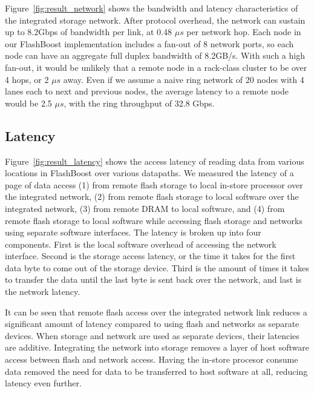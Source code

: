 Figure~\ref{fig:result_network} shows the bandwidth and latency characteristics
of the integrated storage network. After protocol overhead, the network can
sustain up to 8.2Gbps of bandwidth per link, at 0.48 $\mu s$ per network hop.
Each node in our FlashBoost implementation includes a fan-out of 8 network
ports, so each node can have an aggregate full duplex bandwidth of 8.2GB/s. With
such a high fan-out, it would be unlikely that a remote node in a rack-class
cluster to be over 4 hops, or 2 $\mu s$ away. Even if we assume a naive ring
network of 20 nodes with 4 lanes each to next and previous nodes, the average
latency to a remote node would be 2.5 $\mu s$, with the ring throughput of 32.8
Gbps.


\subsection{Latency}

Figure~\ref{fig:result_latency} shows the access latency of reading data from
various locations in FlashBoost over various datapaths. We measured the latency of
a page of data access (1) from remote flash storage to local in-store processor
over the integrated network, (2) from remote flash storage to local software
over the integrated network, (3) from remote DRAM to local software, and (4)
from remote flash storage to local software while accessing flash storage and
networks using separate software interfaces. The latency is broken up into four
components. First is the local software overhead of accessing the network
interface. Second is the storage access latency, or the time it takes for the
first data byte to come out of the storage device. Third is the amount of times
it takes to transfer the data until the last byte is sent back over the network,
and last is the network latency.

It can be seen that remote flash access over the integrated network link reduces
a significant amount of latency compared to using flash and networks as separate
devices. When storage and network are used as separate devices, their latencies
are additive. Integrating the network into storage removes a layer of
host software access between flash and network access. Having the in-store
procesor consume data removed the need for data to be transferred to host
software at all, reducing latency even further.

